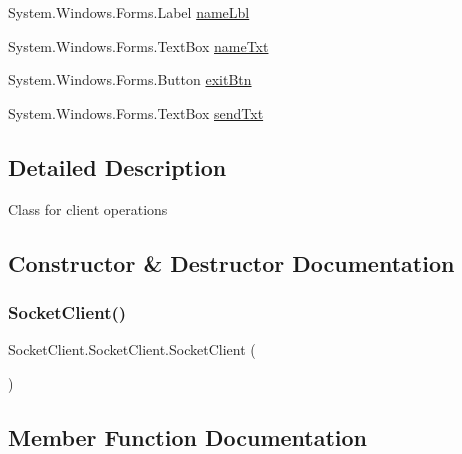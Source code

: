 \begin{DoxyCompactItemize}
\item 
System.\+Windows.\+Forms.\+Label \hyperlink{class_socket_client_1_1_socket_client_af918eefc5c4d3d78f8238ed2bde0d6b8}{name\+Lbl}
\item 
System.\+Windows.\+Forms.\+Text\+Box \hyperlink{class_socket_client_1_1_socket_client_a88b44242ed0a3716498b1dd4c6f19a39}{name\+Txt}
\item 
System.\+Windows.\+Forms.\+Button \hyperlink{class_socket_client_1_1_socket_client_a6874b1727fc1ddd55e07545e7cd6e28d}{exit\+Btn}
\item 
System.\+Windows.\+Forms.\+Text\+Box \hyperlink{class_socket_client_1_1_socket_client_ae178c12147d21c828bb8a444267289ee}{send\+Txt}
\end{DoxyCompactItemize}


\subsection{Detailed Description}
Class for client operations 



\subsection{Constructor \& Destructor Documentation}
\mbox{\label{class_socket_client_1_1_socket_client_aa6b5f080048da540d30bfe849b1e3260}} 
\subsubsection{\texorpdfstring{Socket\+Client()}{SocketClient()}}
{\footnotesize\ttfamily Socket\+Client.\+Socket\+Client.\+Socket\+Client (\begin{DoxyParamCaption}{ }\end{DoxyParamCaption})\hspace{0.3cm}{\ttfamily [inline]}}



\subsection{Member Function Documentation}
\mbox{\label{class_socket_client_1_1_socket_client_a938dd095e77445dbc0ac020da5023571}} 

